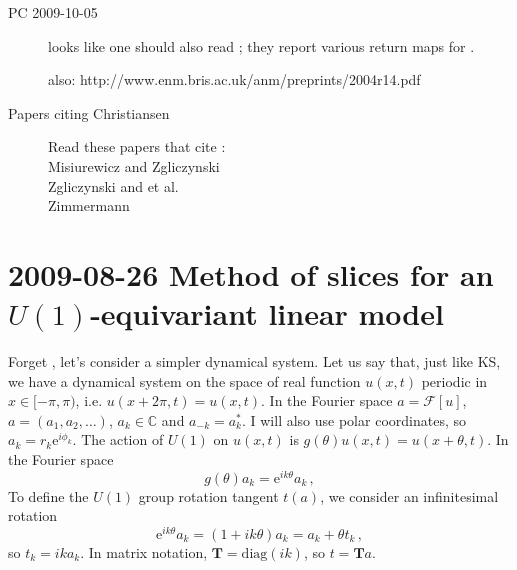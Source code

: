 \begin{description}
\item[PC 2009-10-05]
looks like one should also read ; they
report various return maps for \cLe.


also:
http://www.enm.bris.ac.uk/anm/preprints/2004r14.pdf

\item[Papers citing Christiansen \etal]
Read these papers  that cite :
    \\
Misiurewicz and Zgliczynski
    \\
Zgliczynski and et al.
    \\
Zimmermann



\end{description}

\section{2009-08-26 Method of slices for an $U(1)$-equivariant linear model}
\renewcommand{\ssp}{a}


\medskip{} Forget \KS, let's consider a simpler dynamical system.
Let us say that, just like KS, we have a dynamical system on the space of real function $u(x,t)$ periodic in $x \in [-\pi, \pi)$, i.e. $u(x+2\pi,t) = u(x,t)$.  In the Fourier space $a = \mathcal{F}[u]$, $a = (a_1, a_2, \ldots)$, $a_k \in \mathbb{C}$ and $a_{-k} = a_k^\ast$.
I will also use polar coordinates, so $a_k = r_k \mathrm{e}^{i \phi_k}$.
The action of $U(1)$ on $u(x,t)$ is $g(\theta) u(x,t) = u(x+\theta,t)$. In the Fourier space
\[ g(\theta) a_k = \mathrm{e}^{ik\theta}a_k\,, \]
To define the $U(1)$ group rotation tangent $t(a)$, we consider an infinitesimal rotation
\[ \mathrm{e}^{ik\theta}a_k = (1 + ik\theta)a_k  = a_k + \theta t_k\,, \]
so $t_k = ika_k$.
In matrix notation, $\mathbf{T} = \mathrm{diag}(ik)$,
    so  $t = \mathbf{T}a$.

